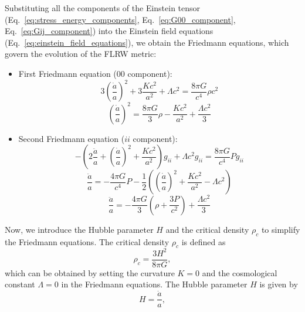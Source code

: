 Substituting all the components of the Einstein tensor (Eq.~\eqref{eq:stress_energy_components}, Eq.~\eqref{eq:G00_component}, Eq.~\eqref{eq:Gij_component}) into the Einstein field equations (Eq.~\eqref{eq:einstein_field_equations}), we obtain the Friedmann equations, which govern the evolution of the FLRW metric:
\begin{itemize}
    \item First Friedmann equation ($00$ component):
    \begin{equation}
        3 \left( \frac{\dot{a}}{a} \right)^2 + 3\frac{Kc^2}{a^2} + \Lambda c^2 = \frac{8\pi G}{c^4} \rho c^2
    \end{equation}
    \begin{equation}
        \left( \frac{\dot{a}}{a} \right)^2 = \frac{8\pi G}{3} \rho - \frac{Kc^2}{a^2} + \frac{\Lambda c^2}{3}
        \label{eq:friedmann_first}
    \end{equation}
    \item Second Friedmann equation ($ii$ component):
    \begin{equation}
        -\left(2\frac{\ddot{a}}{a} + \left( \frac{\dot{a}}{a} \right)^2 + \frac{Kc^2}{a^2}\right)g_{ii} + \Lambda c^2 g_{ii} = \frac{8\pi G}{c^4} P g_{ii}
    \end{equation}
    \begin{equation}
        \frac{\ddot{a}}{a} = -\frac{4\pi G}{c^4} P - \frac{1}{2} \left(\left( \frac{\dot{a}}{a} \right)^2 
            + \frac{Kc^2}{a^2} - \Lambda c^2 \right)
    \end{equation}
    \begin{equation}
        \frac{\ddot{a}}{a} = -\frac{4\pi G}{3} \left( \rho + \frac{3P}{c^2} \right) + \frac{\Lambda c^2}{3}
        \label{eq:friedmann_second}
    \end{equation}
\end{itemize}

Now, we introduce the Hubble parameter \( H \) and the critical density \( \rho_c \) to simplify the Friedmann equations. The critical density \( \rho_c \) is defined as
\begin{equation}
    \label{eq:critical_density}
    \rho_c = \dfrac{3 H^2}{8\pi G},
\end{equation}
which can be obtained by setting the curvature \( K = 0 \) and the cosmological constant \( \Lambda = 0 \) in the Friedmann equations. The Hubble parameter \( H \) is given by
\begin{equation}
    \label{eq:hubble_parameter}
    H = \dfrac{\dot{a}}{a},
\end{equation}

